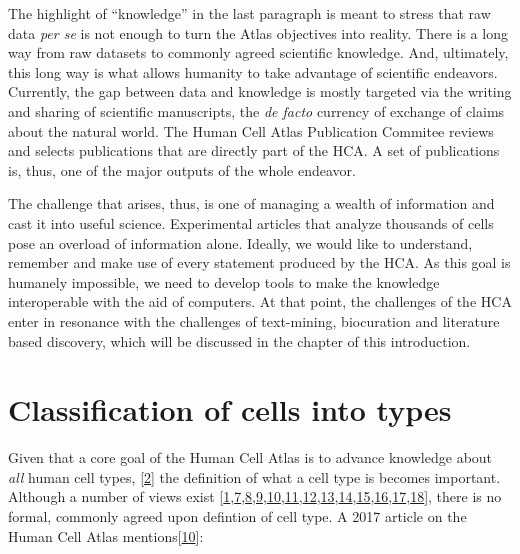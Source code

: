 The highlight of ``knowledge'' in the last paragraph is meant to stress that raw data \emph{per se} is not enough to turn the Atlas objectives into reality.
There is a long way from raw datasets to commonly agreed scientific knowledge.
And, ultimately, this long way is what allows humanity to take advantage of scientific endeavors.
Currently, the gap between data and knowledge is mostly targeted via the writing and sharing of scientific manuscripts, the \emph{de facto} currency of exchange of claims about the natural world.
The Human Cell Atlas Publication Commitee reviews and selects publications that are directly part of the HCA.
A set of publications is, thus, one of the major outputs of the whole endeavor.

The challenge that arises, thus, is one of managing a wealth of information and cast it into useful science.
Experimental articles that analyze thousands of cells pose an overload of information alone.
Ideally, we would like to understand, remember and make use of every statement produced by the HCA.
As this goal is humanely impossible, we need to develop tools to make the knowledge interoperable with the aid of computers.
At that point, the challenges of the HCA enter in resonance with the challenges of text-mining, biocuration and literature based discovery, which will be discussed in the chapter of this introduction.

\hypertarget{classification-of-cells-into-types}{%
\section{Classification of cells into types}\label{classification-of-cells-into-types}}

Given that a core goal of the Human Cell Atlas is to advance knowledge about \emph{all} human cell types, {[}\protect\hyperlink{ref-1GmbExweg}{2}{]} the definition of what a cell type is becomes important.
Although a number of views exist {[}\protect\hyperlink{ref-pNGap1Du}{1},\protect\hyperlink{ref-paKiKTRS}{7},\protect\hyperlink{ref-sWv3okaH}{8},\protect\hyperlink{ref-19yYJWEkz}{9},\protect\hyperlink{ref-BlxFp1v3}{10},\protect\hyperlink{ref-eOUB1Bmj}{11},\protect\hyperlink{ref-TupzTvtA}{12},\protect\hyperlink{ref-w0Woz7JE}{13},\protect\hyperlink{ref-srfuRMe}{14},\protect\hyperlink{ref-1GXQByEaQ}{15},\protect\hyperlink{ref-k0Pe9YOB}{16},\protect\hyperlink{ref-MoaYZAA0}{17},\protect\hyperlink{ref-WAeCfntu}{18}{]}, there is no formal, commonly agreed upon defintion of cell type.
A 2017 article on the Human Cell Atlas mentions{[}\protect\hyperlink{ref-BlxFp1v3}{10}{]}:

